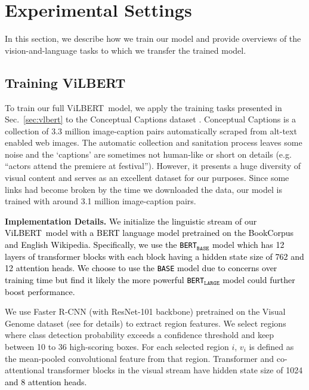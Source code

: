 \section{Experimental Settings}
\label{sec:exp}
In this section, we describe how we train our model and provide overviews of the vision-and-language tasks to which we transfer the trained model.

\subsection{Training ViLBERT}
\label{sec:train}
To train our full ViLBERT~model, we apply the training tasks presented in Sec.~\ref{sec:vlbert} to the Conceptual Captions dataset \cite{sharma2018conceptual}. Conceptual Captions is a collection of 3.3 million image-caption pairs automatically scraped from alt-text enabled web images. The automatic collection and sanitation process leaves some noise and the `captions' are sometimes not human-like or short on details (e.g. ``actors attend the premiere at festival''). However, it presents a huge diversity of visual content and serves as an excellent dataset for our purposes. Since some links had become broken by the time we downloaded the data, our model is trained with around 3.1 million image-caption pairs. 

\textbf{Implementation Details.} \textcolor{Black}{We initialize the linguistic stream of our ViLBERT~model with a BERT language model pretrained on the BookCorpus \cite{zhu2015aligning} and English Wikipedia. Specifically, we use the \texttt{BERT$_{\texttt{BASE}}$} model \cite{devlin2018bert} which has 12 layers of transformer blocks with each block having a hidden state size of 762 and 12 attention heads. We choose to use the \texttt{BASE} model due to concerns over training time but find it likely the more powerful \texttt{BERT$_{\texttt{LARGE}}$} model could further boost performance.} 

We use Faster R-CNN \cite{ren2015faster} (with ResNet-101 \cite{he2016deep} backbone) pretrained on the Visual Genome dataset \cite{krishnavisualgenome} (see \cite{anderson2018bottom} for details) to extract region features. We select regions where class detection probability exceeds a confidence threshold and keep between 10 to 36 high-scoring boxes. For each selected region $i$, $v_i$ is defined as the mean-pooled convolutional feature from that region. Transformer and co-attentional transformer blocks in the visual stream have hidden state size of 1024 \textcolor{Black}{and 8 attention heads.} 

